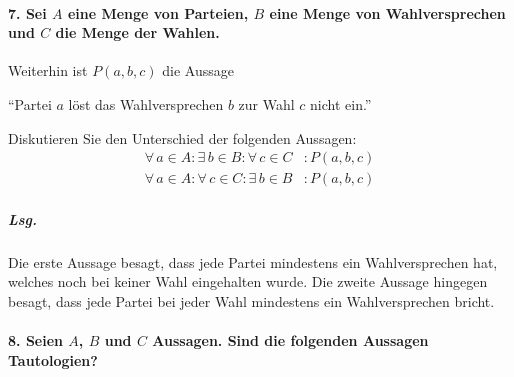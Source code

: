 \documentclass{scrreprt}
\begin{document}
\paragraph{7. Sei $A$ eine Menge von Parteien, $B$ eine Menge von Wahlversprechen
  und $C$ die Menge der Wahlen.}
Weiterhin ist $P(a, b, c)$ die Aussage
\begin{center}
  ``Partei $a$ löst das Wahlversprechen $b$ zur Wahl $c$ nicht ein.'' 
\end{center}

Diskutieren Sie den Unterschied der folgenden Aussagen:
\renewcommand{\theequation}{\arabic{equation}}
\begin{align}
  \forall \, a \in A \colon \exists \, b \in B \colon \forall \, c \in C &\colon P(a, b, c) \\
  \forall \, a \in A \colon \forall \, c \in C \colon \exists \, b \in B &\colon P(a, b, c)
\end{align}

\subparagraph{Lsg.}
Die erste Aussage besagt, dass jede Partei mindestens ein Wahlversprechen hat,
welches noch bei keiner Wahl eingehalten wurde.
Die zweite Aussage hingegen besagt, dass jede Partei bei jeder Wahl mindestens
ein Wahlversprechen bricht.

\newpage
\paragraph{8. Seien $A$, $B$ und $C$ Aussagen. Sind die folgenden Aussagen Tautologien?}
\end{document}
